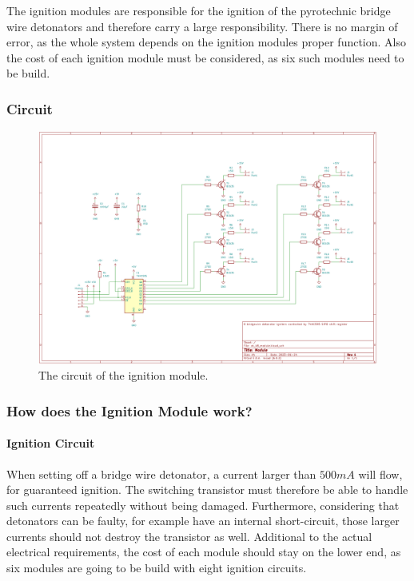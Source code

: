 \noindent The ignition modules are responsible for the ignition of the pyrotechnic bridge wire detonators and therefore carry a large responsibility. There is no margin of error, as the whole system depends on the ignition modules proper function. Also the cost of each ignition module must be considered, as six such modules need to be build.

\subsubsection{Circuit}

\begin{figure}[!ht]
    \centering
    \includegraphics[width=15cm]{./Figures/module_circuit.png}
    \caption{The circuit of the ignition module.}
    \label{fig:module_circuit}     
\end{figure}

\pagebreak

\subsubsection{How does the Ignition Module work?}
\label{Ignition Module work}
\paragraph{Ignition Circuit}
\noindent When setting off a bridge wire detonator, a current larger than $500mA$ will flow, for guaranteed ignition. The switching transistor must therefore be able to handle such currents repeatedly without being damaged. Furthermore, considering that detonators can be faulty, for example have an internal short-circuit, those larger currents should not destroy the transistor as well. Additional to the actual electrical requirements, the cost of each module should stay on the lower end, as six modules are going to be build with eight ignition circuits.\\

